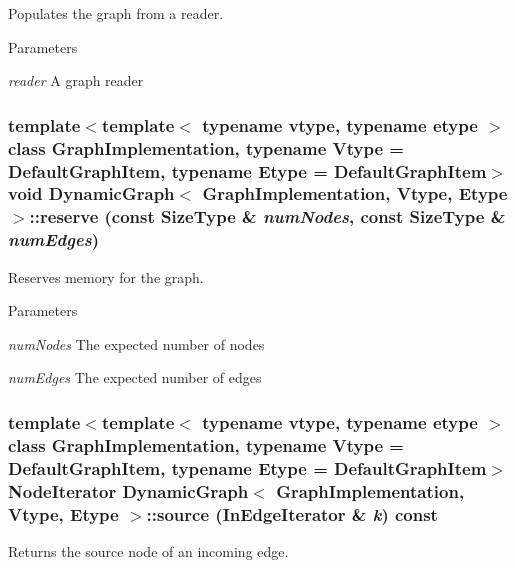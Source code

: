 Populates the graph from a reader. 


\begin{DoxyParams}{Parameters}
\item[{\em reader}]A graph reader \end{DoxyParams}
\hypertarget{class_dynamic_graph_a8d0cc3347df5c1e93400c789e83f7dd6}{
\subsubsection[{reserve}]{\setlength{\rightskip}{0pt plus 5cm}template$<$template$<$ typename vtype, typename etype $>$ class GraphImplementation, typename Vtype  = DefaultGraphItem, typename Etype  = DefaultGraphItem$>$ void {\bf DynamicGraph}$<$ GraphImplementation, Vtype, Etype $>$::reserve (const SizeType \& {\em numNodes}, \/  const SizeType \& {\em numEdges})}}
\label{class_dynamic_graph_a8d0cc3347df5c1e93400c789e83f7dd6}


Reserves memory for the graph. 


\begin{DoxyParams}{Parameters}
\item[{\em numNodes}]The expected number of nodes \item[{\em numEdges}]The expected number of edges \end{DoxyParams}
\hypertarget{class_dynamic_graph_ad402237d152a83fe948f8891a2ad1316}{
\subsubsection[{source}]{\setlength{\rightskip}{0pt plus 5cm}template$<$template$<$ typename vtype, typename etype $>$ class GraphImplementation, typename Vtype  = DefaultGraphItem, typename Etype  = DefaultGraphItem$>$ NodeIterator {\bf DynamicGraph}$<$ GraphImplementation, Vtype, Etype $>$::source (InEdgeIterator \& {\em k}) const}}
\label{class_dynamic_graph_ad402237d152a83fe948f8891a2ad1316}


Returns the source node of an incoming edge. 


